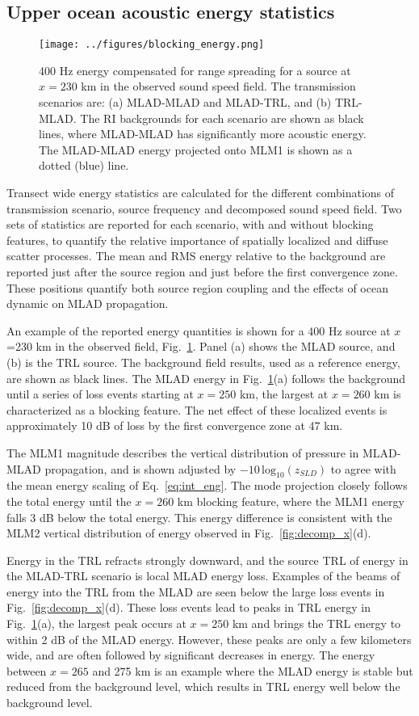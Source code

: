 \documentclass[preprint,NumberedRefs]{JASA}
\begin{document}
\subsection{Upper ocean acoustic energy statistics}\label{ssec:energy}
\begin{figure}
\texttt{[image: ../figures/blocking\_energy.png]}
    \caption{400 Hz energy compensated for range spreading for a source at $x=230$ km in the observed sound speed field. The transmission scenarios are: (a) MLAD-MLAD and MLAD-TRL, and (b) TRL-MLAD. The RI backgrounds for each scenario are shown as black lines, where MLAD-MLAD has significantly more acoustic energy. The MLAD-MLAD energy projected onto MLM1 is shown as a dotted (blue) line.}
    \label{fig:ml_energy}
\end{figure}
Transect wide energy statistics are calculated for the different combinations of transmission scenario, source frequency and decomposed sound speed field. Two sets of statistics are reported for each scenario, with and without blocking features, to quantify the relative importance of spatially localized and diffuse scatter processes. The mean and RMS energy relative to the background are reported just after the source region and just before the first convergence zone. These positions quantify both source region coupling and the effects of ocean dynamic on MLAD propagation.

An example of the reported energy quantities is shown for a 400 Hz source at $x$=230 km in the observed field, Fig.~\ref{fig:ml_energy}. Panel (a) shows the MLAD source, and (b) is the TRL source. The background field results, used as a reference energy, are shown as black lines. The MLAD energy in Fig.~\ref{fig:ml_energy}(a) follows the background until a series of loss events starting at $x=250$ km, the largest at $x=260$ km is characterized as a blocking feature. The net effect of these localized events is approximately 10 dB of loss by the first convergence zone at 47 km.

The MLM1 magnitude describes the vertical distribution of pressure in MLAD-MLAD propagation, and is shown adjusted by $-10 \, \textrm{log}_{10}(z_{SLD})$ to agree with the mean energy scaling of Eq.~\eqref{eq:int_eng}. The mode projection closely follows the total energy until the $x=260$ km blocking feature, where the MLM1 energy falls 3 dB below the total energy. This energy difference is consistent with the MLM2 vertical distribution of energy observed in Fig.~\ref{fig:decomp_x}(d).

Energy in the TRL refracts strongly downward, and the source TRL of energy in the MLAD-TRL scenario is local MLAD energy loss. Examples of the beams of energy into the TRL from the MLAD are seen below the large loss events in Fig.~\ref{fig:decomp_x}(d). These loss events lead to peaks in TRL energy in Fig.~\ref{fig:ml_energy}(a), the largest peak occurs at $x=250$ km and brings the TRL energy to within 2 dB of the MLAD energy. However, these peaks are only a few kilometers wide, and are often followed by significant decreases in energy. The energy between $x=265$ and 275 km is an example where the MLAD energy is stable but reduced from the background level, which results in TRL energy well below the background level.
\end{document}
